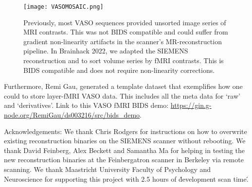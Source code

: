 \documentclass[../main.tex]{subfiles}
\begin{document}
\begin{figure}
	\centering
	\texttt{[image: VASOMOSAIC.png]}
	\caption{Previously, most VASO sequences provided unsorted image series of MRI contrasts. This was not BIDS compatible and could suffer from gradient non-linearity artifacts in the scanner’s MR-reconstruction pipeline. In Brainhack 2022, we adapted the SIEMENS reconstruction and to sort volume series by fMRI contrasts. This is BIDS compatible and does not require non-linearity corrections.
}
	\label{fig:VASOMOSAIC}
\end{figure}

Furthermore, Remi Gau, generated a template dataset that exemplifies how one could to store layer-fMRI VASO data. This includes all the meta data for ‘raw’ and ‘derivatives’. Link to this VASO fMRI BIDS demo: \url{https://gin.g-node.org/RemiGau/ds003216/src/bids_demo}.

Acknowledgements: We thank Chris Rodgers for instructions on how to overwrite existing reconstruction binaries on the SIEMENS scanner without rebooting. We thank David Feinberg, Alex Beckett and Samantha Ma for helping in testing the new reconstruction binaries at the Feinbergatron scanner in Berkeley via remote scanning. We thank Maastricht University Faculty of Psychology and Neuroscience for supporting this project with 2.5 hours of \'development scan time\'.
\end{document}
